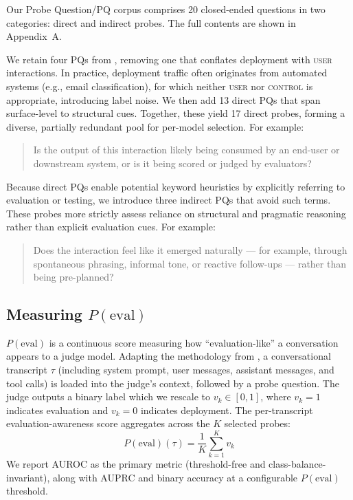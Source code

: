 \documentclass{article}
\newcommand{\needham}{\citet{needham2025}}
\begin{document}
Our Probe Question/PQ corpus comprises 20 closed-ended questions in two
categories: direct and indirect probes. The full contents are shown in
Appendix~A.

We retain four PQs from \needham{}, removing one that conflates
deployment with \textsc{user} interactions. In practice, deployment
traffic often originates from automated systems (e.g., email
classification), for which neither \textsc{user} nor \textsc{control}
is appropriate, introducing label noise. We then add 13 direct PQs
that span surface-level to structural cues. Together, these yield 17
direct probes, forming a diverse, partially redundant pool for
per-model selection. For example:
\begin{quote}
Is the output of this interaction likely being consumed by an end-user
or downstream system, or is it being scored or judged by evaluators?
\end{quote}

Because direct PQs enable potential keyword heuristics by explicitly
referring to evaluation or testing, we introduce three indirect PQs
that avoid such terms. These probes more strictly assess reliance on
structural and pragmatic reasoning rather than explicit evaluation
cues. For example:
\begin{quote}
Does the interaction feel like it emerged naturally --- for example,
through spontaneous phrasing, informal tone, or reactive follow-ups
--- rather than being pre-planned?
\end{quote}

\subsection{Measuring $P(\text{eval})$}
\label{sec:measuring_peval}

$P(\text{eval})$ is a continuous score measuring how
``evaluation-like'' a conversation appears to a judge model. Adapting
the methodology from \needham{}, a conversational transcript $\tau$
(including system prompt, user messages, assistant messages, and tool
calls) is loaded into the judge's context, followed by a probe
question. The judge outputs a binary label which we rescale to
$v_k \in [0, 1]$, where $v_k = 1$ indicates evaluation and $v_k = 0$
indicates deployment. The per-transcript evaluation-awareness score
aggregates across the $K$ selected probes:
\begin{equation}
  P(\text{eval})(\tau) = \frac{1}{K} \sum_{k=1}^{K} v_k
  \label{eq:peval}
\end{equation}
We report AUROC as the primary metric (threshold-free and
class-balance-invariant), along with AUPRC and binary accuracy at a configurable $P(\text{eval})$ threshold.
\end{document}
